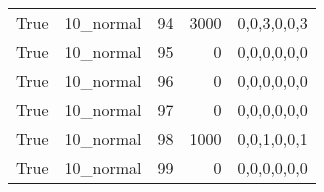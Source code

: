 \begin{tabular}{llrrl}
 True            & 10\_normal           &            94 &                  3000 & 0,0,3,0,0,3   \\
 True            & 10\_normal           &            95 &                     0 & 0,0,0,0,0,0   \\
 True            & 10\_normal           &            96 &                     0 & 0,0,0,0,0,0   \\
 True            & 10\_normal           &            97 &                     0 & 0,0,0,0,0,0   \\
 True            & 10\_normal           &            98 &                  1000 & 0,0,1,0,0,1   \\
 True            & 10\_normal           &            99 &                     0 & 0,0,0,0,0,0   \\
\hline
\end{tabular}
